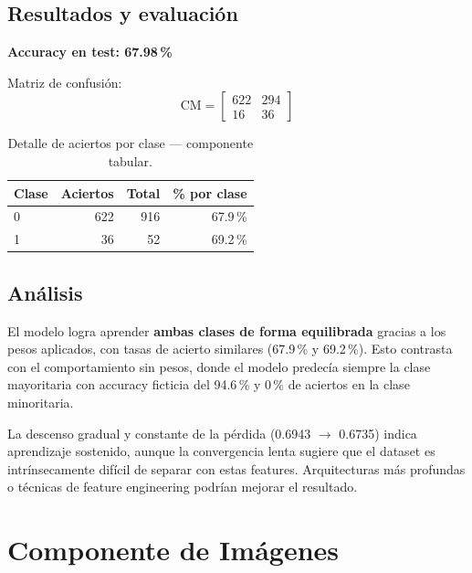 \documentclass[12pt,a4paper]{article}
\begin{document}
\subsection{Resultados y evaluación}

\begin{resultbox}
\textbf{Accuracy en test: 67.98\,\%}
\end{resultbox}

\vspace{0.5em}

Matriz de confusión:
\[
  \text{CM} =
  \begin{bmatrix}
    622 & 294 \\
     16 &  36
  \end{bmatrix}
\]

\begin{table}[H]
  \centering
  \begin{tabular}{lrrr}
    \toprule
    \textbf{Clase} & \textbf{Aciertos} & \textbf{Total} & \textbf{\% por clase} \\
    \midrule
    0 & 622 & 916 & 67.9\,\% \\
    1 &  36 &  52 & 69.2\,\% \\
    \bottomrule
  \end{tabular}
  \caption{Detalle de aciertos por clase — componente tabular.}
\end{table}

\subsection{Análisis}

El modelo logra aprender \textbf{ambas clases de forma equilibrada} gracias a
los pesos aplicados, con tasas de acierto similares (67.9\,\% y 69.2\,\%).
Esto contrasta con el comportamiento sin pesos, donde el modelo predecía siempre
la clase mayoritaria con accuracy ficticia del 94.6\,\% y 0\,\% de aciertos en
la clase minoritaria.

La descenso gradual y constante de la pérdida (0.6943 $\to$ 0.6735) indica
aprendizaje sostenido, aunque la convergencia lenta sugiere que el dataset es
intrínsecamente difícil de separar con estas features. Arquitecturas más profundas
o técnicas de feature engineering podrían mejorar el resultado.

\section{Componente de Imágenes}
\end{document}
